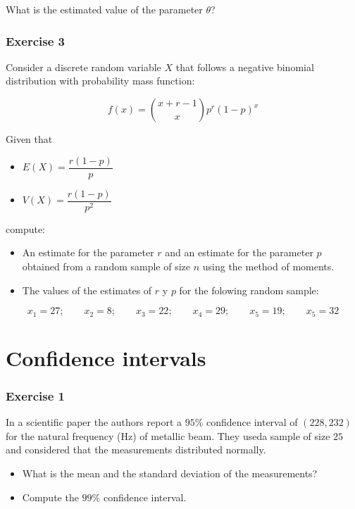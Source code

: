 \documentclass[
]{book}
\providecommand{\tightlist}{%
  \setlength{\itemsep}{0pt}\setlength{\parskip}{0pt}}
\begin{document}
What is the estimated value of the parameter \(\theta\)?

\hypertarget{exercise-3-5}{%
\subsubsection{Exercise 3}\label{exercise-3-5}}

Consider a discrete random variable \(X\) that follows a negative binomial distribution with probability mass function:

\[f(x) = \binom{x+r-1}{x}p^r(1-p)^x\]

Given that

\begin{itemize}
\tightlist
\item
  \(E(X)=\dfrac{r(1-p)}{p}\)
\item
  \(V(X) =\dfrac{r(1-p)}{p^2}\)
\end{itemize}

compute:

\begin{itemize}
\item
  An estimate for the parameter \(r\) and an estimate for the parameter \(p\) obtained from a random sample of size \(n\) using the method of moments.
\item
  The values of the estimates of \(r\) y \(p\) for the folowing random sample:
\end{itemize}

\[x_1 = 27; \qquad x_2 = 8; \qquad  x_3 = 22; \qquad  x_4 = 29; \qquad  x_5 = 19; \qquad  x_5 = 32\]

\hypertarget{confidence-intervals}{%
\section{Confidence intervals}\label{confidence-intervals}}

\hypertarget{exercise-1-9}{%
\subsubsection{Exercise 1}\label{exercise-1-9}}

In a scientific paper the authors report a \(95\%\) confidence interval of \((228, 232)\) for the natural frequency (Hz) of metallic beam. They useda sample of size \(25\) and considered that the measurements distributed normally.

\begin{itemize}
\item
  What is the mean and the standard deviation of the measurements?
\item
  Compute the \(99\%\) confidence interval.
\end{itemize}
\end{document}

